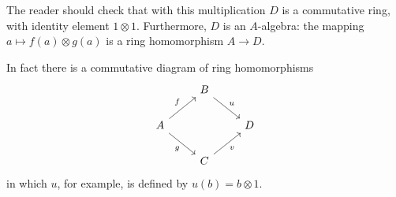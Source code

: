 The reader should check that with this multiplication $D$ is a commutative ring, with identity element $1 \otimes 1$. Furthermore, $D$ is an $A$-algebra: the mapping $a \mapsto f(a) \otimes g(a)$ is a ring homomorphism $A \to D$.

In fact there is a commutative diagram of ring homomorphisms
\[
\begin{tikzcd}
 & B \arrow[rd, "u"] & \\
A \arrow[ru, "f"] \arrow[rd, "g"'] & & D \\
 & C \arrow[ru, "v"'] &
\end{tikzcd}
\]
in which $u$, for example, is defined by $u(b) = b \otimes 1$.


